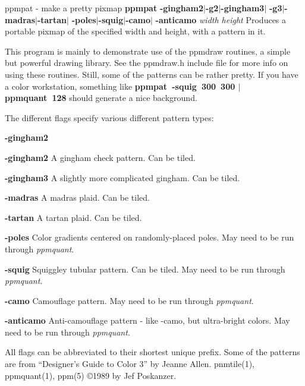 ppmpat - make a pretty pixmap
{\bf ppmpat}
{\bf -gingham2}{\rm $|$}{\bf -g2}{\rm $|$}{\bf -gingham3}{\rm $|$}
{\bf -g3}{\rm $|$}{\bf -madras}{\rm $|$}{\bf -tartan}{\rm $|$}
{\bf -poles}{\rm $|$}{\bf -squig}{\rm $|$}{\bf -camo}{\rm $|$}
{\bf -anticamo}
{\it width height}
Produces a portable pixmap of the specified width and height,
with a pattern in it.
\par
This program is mainly to demonstrate use of the ppmdraw routines, a
simple but powerful drawing library.
See the ppmdraw.h include file for more info on using these routines.
Still, some of the patterns can be rather pretty.
If you have a color workstation, something like
{\bf ppmpat\ -squig\ 300\ 300 $|$ ppmquant\ 128}
should generate a nice background.
\par
The different flags specify various different pattern types:
\begin{TPlist}{{\bf -gingham2}}
\item[{{\bf -gingham2}}]
A gingham check pattern.  Can be tiled.
\item[{{\bf -gingham3}}]
A slightly more complicated gingham.  Can be tiled.
\item[{{\bf -madras}}]
A madras plaid.  Can be tiled.
\item[{{\bf -tartan}}]
A tartan plaid.  Can be tiled.
\item[{{\bf -poles}}]
Color gradients centered on randomly-placed poles.
May need to be run through
{\it ppmquant}{\rm .}
\item[{{\bf -squig}}]
Squiggley tubular pattern.  Can be tiled.
May need to be run through
{\it ppmquant}{\rm .}
\item[{{\bf -camo}}]
Camouflage pattern.
May need to be run through
{\it ppmquant}{\rm .}
\item[{{\bf -anticamo}}]
Anti-camouflage pattern - like -camo, but ultra-bright colors.
May need to be run through
{\it ppmquant}{\rm .}
\end{TPlist}

\par
All flags can be abbreviated to their shortest unique prefix.
Some of the patterns are from ``Designer's Guide to Color 3'' by Jeanne Allen.
pnmtile(1), ppmquant(1), ppm(5)
\copyright 1989 by Jef Poskanzer.
%
 
